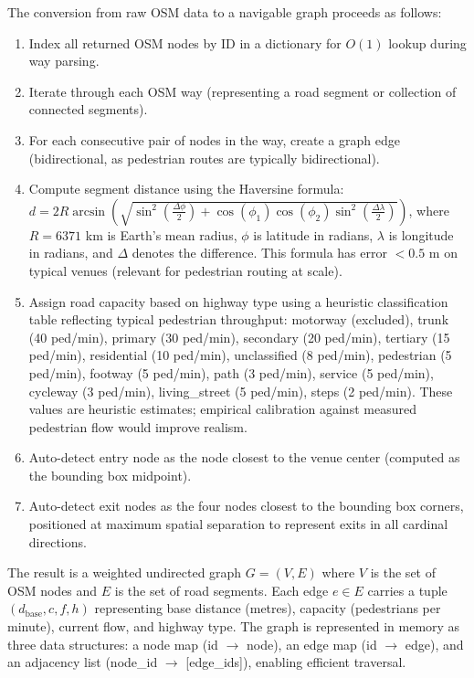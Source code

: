 \documentclass[conference]{IEEEtran}
\begin{document}
The conversion from raw OSM data to a navigable graph proceeds as follows:
\begin{enumerate}
\item Index all returned OSM nodes by ID in a dictionary for $O(1)$ lookup during way parsing.
\item Iterate through each OSM way (representing a road segment or collection of connected segments).
\item For each consecutive pair of nodes in the way, create a graph edge (bidirectional, as pedestrian routes are typically bidirectional).
\item Compute segment distance using the Haversine formula: $d = 2R \arcsin\left(\sqrt{\sin^2\left(\frac{\Delta\phi}{2}\right) + \cos(\phi_1)\cos(\phi_2)\sin^2\left(\frac{\Delta\lambda}{2}\right)}\right)$, where $R = 6371$ km is Earth's mean radius, $\phi$ is latitude in radians, $\lambda$ is longitude in radians, and $\Delta$ denotes the difference. This formula has error $< 0.5$ m on typical venues (relevant for pedestrian routing at scale).
\item Assign road capacity based on highway type using a heuristic classification table reflecting typical pedestrian throughput: motorway (excluded), trunk (40 ped/min), primary (30 ped/min), secondary (20 ped/min), tertiary (15 ped/min), residential (10 ped/min), unclassified (8 ped/min), pedestrian (5 ped/min), footway (5 ped/min), path (3 ped/min), service (5 ped/min), cycleway (3 ped/min), living\_street (5 ped/min), steps (2 ped/min). These values are heuristic estimates; empirical calibration against measured pedestrian flow would improve realism.
\item Auto-detect entry node as the node closest to the venue center (computed as the bounding box midpoint).
\item Auto-detect exit nodes as the four nodes closest to the bounding box corners, positioned at maximum spatial separation to represent exits in all cardinal directions.
\end{enumerate}

The result is a weighted undirected graph $G = (V, E)$ where $V$ is the set of OSM nodes and $E$ is the set of road segments. Each edge $e \in E$ carries a tuple $(d_{\text{base}}, c, f, h)$ representing base distance (metres), capacity (pedestrians per minute), current flow, and highway type. The graph is represented in memory as three data structures: a node map (id $\to$ node), an edge map (id $\to$ edge), and an adjacency list (node\_id $\to$ [edge\_ids]), enabling efficient traversal.
\end{document}
